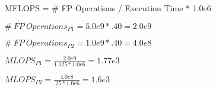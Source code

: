 \documentclass{article}
\begin{document}
    MFLOPS = \# FP Operations / Execution Time * 1.0e6

    $\#\ FP\ Operations_{P1} = 5.0e9 * .40 = 2.0e9$

    $\#\ FP\ Operations_{P2} = 1.0e9 * .40 = 4.0e8$
    \vspace*{6pt}

    $MLOPS_{P1} = \frac{2.0e9}{1.125 * 1.0e6} = 1.77e3$
    \vspace*{6pt}

    $MLOPS_{P2} = \frac{4.0e8}{.25 * 1.0e6} = 1.6e3$
    




    \vspace*{6pt}












    

    
\end{document}
